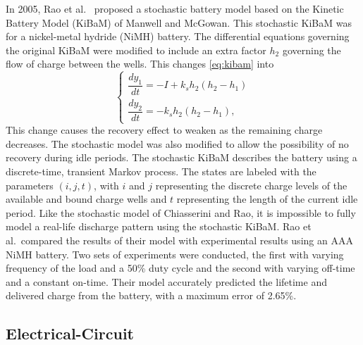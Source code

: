 \documentclass[../zhang_thesis.tex]{subfiles}
\begin{document}
In 2005, Rao et al.~\cite{rao05} proposed a stochastic battery model based on the Kinetic Battery Model (KiBaM) of Manwell and McGowan. This stochastic KiBaM was for a nickel-metal hydride (NiMH) battery. The differential equations governing the original KiBaM were modified to include an extra factor $h_2$ governing the flow of charge between the wells. This changes \cref{eq:kibam} into
\begin{equation}
    \begin{cases}
        \dfrac{dy_1}{dt} = -I + k_s h_2 \left( h_2 - h_1 \right) \\
        \dfrac{dy_2}{dt} = -k_s h_2 \left( h_2 - h_1 \right),
    \end{cases}
\end{equation}
This change causes the recovery effect to weaken as the remaining charge decreases. The stochastic model was also modified to allow the possibility of no recovery during idle periods. The stochastic KiBaM describes the battery using a discrete-time, transient Markov process. The states are labeled with the parameters $(i,j,t)$, with $i$ and $j$ representing the discrete charge levels of the available and bound charge wells and $t$ representing the length of the current idle period.
Like the stochastic model of Chiasserini and Rao, it is impossible to fully model a real-life discharge pattern using the stochastic KiBaM. Rao et al.\ compared the results of their model with experimental results using an AAA NiMH battery. Two sets of experiments were conducted, the first with varying frequency of the load and a 50\% duty cycle and the second with varying off-time and a constant on-time. Their model accurately predicted the lifetime and delivered charge from the
battery, with a maximum error of 2.65\%.

\subsection{Electrical-Circuit}
\end{document}
